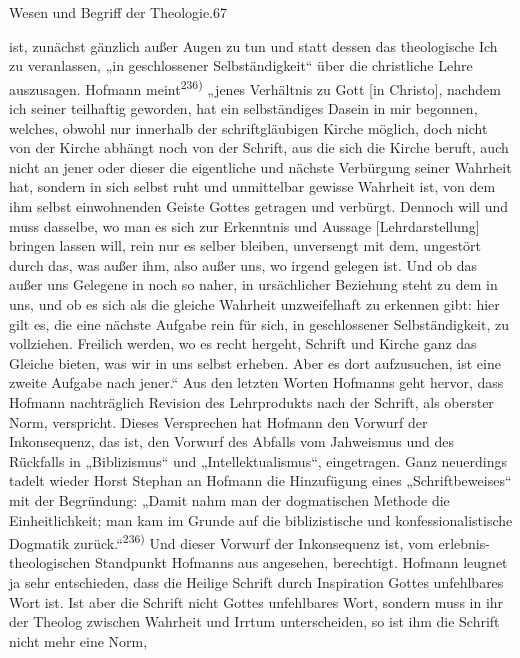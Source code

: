 \noindent\small Wesen und Begriff der Theologie.\hfill 67\par\medskipgesagt ist, zunächst gänzlich außer Augen zu tun und statt dessen das theologische Ich zu veranlassen, „in geschlossener Selbständigkeit“ über die christliche Lehre auszusagen. Hofmann meint\textsuperscript{236)} „jenes Verhältnis zu Gott [in Christo], nachdem ich seiner teilhaftig geworden, hat ein selbständiges Dasein in mir begonnen, welches, obwohl nur innerhalb der schriftgläubigen Kirche möglich, doch nicht von der Kirche abhängt noch von der Schrift, aus die sich die Kirche beruft, auch nicht an jener oder dieser die eigentliche und nächste Verbürgung seiner Wahrheit hat, sondern in sich selbst ruht und unmittelbar gewisse Wahrheit ist, von dem ihm selbst einwohnenden Geiste Gottes getragen und verbürgt. Dennoch will und muss dasselbe, wo man es sich zur Erkenntnis und Aussage [Lehrdarstellung] bringen lassen will, rein nur es selber bleiben, unversengt mit dem, ungestört durch das, was außer ihm, also außer uns, wo irgend gelegen ist. Und ob das außer uns Gelegene in noch so naher, in ursächlicher Beziehung steht zu dem in uns, und ob es sich als die gleiche Wahrheit unzweifelhaft zu erkennen gibt: hier gilt es, die eine nächste Aufgabe rein für sich, in geschlossener Selbständigkeit, zu vollziehen. Freilich werden, wo es recht hergeht, Schrift und Kirche ganz das Gleiche bieten, was wir in uns selbst erheben. Aber es dort aufzusuchen, ist eine zweite Aufgabe nach jener.“ Aus den letzten Worten Hofmanns geht hervor, dass Hofmann nachträglich Revision des Lehrprodukts nach der Schrift, als oberster Norm, verspricht. Dieses Versprechen hat Hofmann den Vorwurf der Inkonsequenz, das ist, den Vorwurf des Abfalls vom Jahweismus und des Rückfalls in „Biblizismus“ und „Intellektualismus“, eingetragen. Ganz neuerdings tadelt wieder Horst Stephan an Hofmann die Hinzufügung eines „Schriftbeweises“ mit der Begründung: „Damit nahm man der dogmatischen Methode die Einheitlichkeit; man kam im Grunde auf die biblizistische und konfessionalistische Dogmatik zurück.“\textsuperscript{236)} Und dieser Vorwurf der Inkonsequenz ist, vom erlebnis-theologischen Standpunkt Hofmanns aus angesehen, berechtigt. Hofmann leugnet ja sehr entschieden, dass die Heilige Schrift durch Inspiration Gottes unfehlbares Wort ist. Ist aber die Schrift nicht Gottes unfehlbares Wort, sondern muss in ihr der Theolog zwischen Wahrheit und Irrtum unterscheiden, so ist ihm die Schrift nicht mehr eine Norm,\par\vfill{}